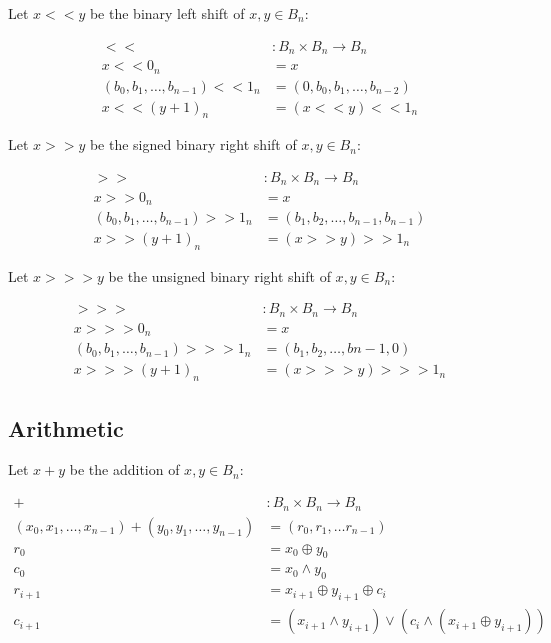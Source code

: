 \documentclass[fleqn]{article}
\begin{document}
Let $x \mathbin{<<} y$ be the binary left shift of $x,y \in B_n$:

\begin{align*}
\mathbin{<<} &: B_n \times B_n \to B_n \\
x \mathbin{<<} 0_n &= x \\
(b_0, b_1, \dots, b_{n-1}) \mathbin{<<} 1_n &= (0, b_0, b_1, \dots, b_{n-2}) \\
x \mathbin{<<} (y+1)_n &= (x \mathbin{<<} y) \mathbin{<<} 1_n
\end{align*}

Let $x \mathbin{>>} y$ be the signed binary right shift of $x,y \in B_n$:

\begin{align*}
\mathbin{>>} &: B_n \times B_n \to B_n \\
x \mathbin{>>} 0_n &= x \\
(b_0, b_1, \dots, b_{n-1}) \mathbin{>>} 1_n &= (b_1, b_2, \dots, b_{n-1}, b_{n-1}) \\
x \mathbin{>>} (y+1)_n &= (x \mathbin{>>} y) \mathbin{>>} 1_n
\end{align*}

Let $x \mathbin{>>>} y$ be the unsigned binary right shift of $x,y \in B_n$:

\begin{align*}
\mathbin{>>>} &: B_n \times B_n \to B_n \\
x \mathbin{>>>} 0_n &= x \\
(b_0, b_1, \dots, b_{n-1}) \mathbin{>>>} 1_n &= (b_1, b_2, \dots, b{n-1}, 0) \\
x \mathbin{>>>} (y+1)_n &= (x \mathbin{>>>} y) \mathbin{>>>} 1_n
\end{align*}

\subsection{Arithmetic}

Let $x + y$ be the addition of $x,y \in B_n$:

\begin{align*}
+ &: B_n \times B_n \to B_n \\
(x_0, x_1, \dots, x_{n-1}) + (y_0, y_1, \dots, y_{n-1}) &= (r_0, r_1, \dots r_{n-1}) \\
r_0 &= x_0 \oplus y_0 \\
c_0 &= x_0 \land y_0 \\
r_{i+1} &= x_{i+1} \oplus y_{i+1} \oplus c_i \\
c_{i+1} &= (x_{i+1} \land y_{i+1}) \lor (c_i \land (x_{i+1} \oplus y_{i+1}))
\end{align*}
\end{document}
